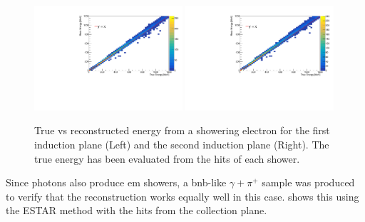 \begin{figure}[h!]
    \centering
    \includegraphics[width = 0.49\textwidth]{figures-chap4/true_vs_reco_plane0_ESTAR.pdf}
    \includegraphics[width = 0.49\textwidth]{figures-chap4/true_vs_reco_plane1_ESTAR.pdf}
    \caption[True vs reconstructed energy from a showering electron for the two induction planes. The true energy has been evaluated from the hits of each shower.]{True vs reconstructed energy from a showering electron for the first induction plane (Left) and the second induction plane (Right). The true energy has been evaluated from the hits of each shower.}
    \label{fig:true_vs_reco_for_induction_planes}
\end{figure}

Since photons also produce \gls{em} showers, a \gls{bnb}-like $\gamma + \pi^+$ sample was produced to verify that the reconstruction works equally well in this case.  shows this using the ESTAR method with the hits from the collection plane. 

